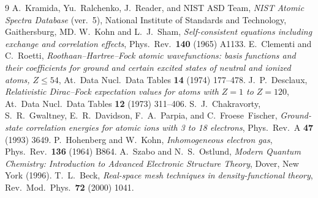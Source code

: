 \documentclass[11pt]{article}
\begin{document}
\begin{thebibliography}{9}
 A.~Kramida, Yu.~Ralchenko, J.~Reader, and NIST ASD Team,
\emph{NIST Atomic Spectra Database} (ver.\ 5), National Institute of Standards and
Technology, Gaithersburg, MD.
 W.~Kohn and L.~J.~Sham, \emph{Self-consistent equations including
exchange and correlation effects}, Phys.\ Rev.\ \textbf{140} (1965) A1133.
 E.~Clementi and C.~Roetti, \emph{Roothaan--Hartree--Fock
atomic wavefunctions: basis functions and their coefficients for ground and certain
excited states of neutral and ionized atoms, $Z\le54$}, At.\ Data Nucl.\ Data Tables
\textbf{14} (1974) 177--478.
 J.~P.~Desclaux, \emph{Relativistic Dirac--Fock expectation values
for atoms with $Z=1$ to $Z=120$}, At.\ Data Nucl.\ Data Tables \textbf{12} (1973)
311--406.
 S.~J.~Chakravorty, S.~R.~Gwaltney, E.~R.~Davidson,
F.~A.~Parpia, and C.~Froese~Fischer, \emph{Ground-state correlation energies for
atomic ions with 3 to 18 electrons}, Phys.\ Rev.\ A \textbf{47} (1993) 3649.
 P.~Hohenberg and W.~Kohn, \emph{Inhomogeneous electron gas},
Phys.\ Rev.\ \textbf{136} (1964) B864.
 A.~Szabo and N.~S.~Ostlund, \emph{Modern Quantum Chemistry:
Introduction to Advanced Electronic Structure Theory}, Dover, New York (1996).
 T.~L.~Beck, \emph{Real-space mesh techniques in density-functional
theory}, Rev.\ Mod.\ Phys.\ \textbf{72} (2000) 1041.
\end{thebibliography}
\end{document}
